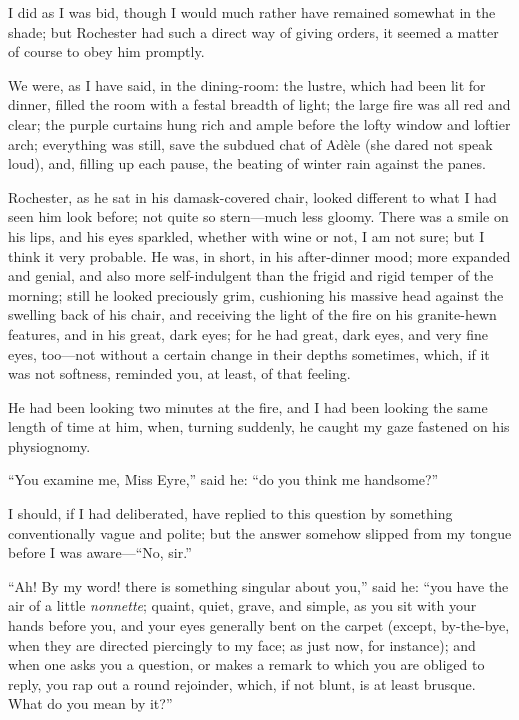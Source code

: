 I did as I was bid, though I would much rather have remained somewhat in
the shade; but \Mr{} Rochester had such a direct way of giving orders, it
seemed a matter of course to obey him promptly.

We were, as I have said, in the dining-room: the lustre, which had been
lit for dinner, filled the room with a festal breadth of light; the
large fire was all red and clear; the purple curtains hung rich and
ample before the lofty window and loftier arch; everything was still,
save the subdued chat of Adèle (she dared not speak loud), and, filling
up each pause, the beating of winter rain against the panes.

\Mr{} Rochester, as he sat in his damask-covered chair, looked different
to what I had seen him look before; not quite so stern---much less
gloomy. There was a smile on his lips, and his eyes sparkled, whether
with wine or not, I am not sure; but I think it very probable. He was,
in short, in his after-dinner mood; more expanded and genial, and also
more self-indulgent than the frigid and rigid temper of the morning;
still he looked preciously grim, cushioning his massive head against the
swelling back of his chair, and receiving the light of the fire on his
granite-hewn features, and in his great, dark eyes; for he had great,
dark eyes, and very fine eyes, too---not without a certain change in
their depths sometimes, which, if it was not softness, reminded you, at
least, of that feeling.

He had been looking two minutes at the fire, and I had been looking the
same length of time at him, when, turning suddenly, he caught my gaze
fastened on his physiognomy.

\enquote{You examine me, Miss Eyre,} said he: \enquote{do you think me
handsome?}

I should, if I had deliberated, have replied to this question by
something conventionally vague and polite; but the answer somehow
slipped from my tongue before I was aware---\enquote{No, sir.}

\enquote{Ah! By my word! there is something singular about you,} said
he: \enquote{you have the air of a little \emph{nonnette}; quaint, quiet,
grave, and simple, as you sit with your hands before you, and your eyes
generally bent on the carpet (except, by-the-bye, when they are directed
piercingly to my face; as just now, for instance); and when one asks you
a question, or makes a remark to which you are obliged to reply, you rap
out a round rejoinder, which, if not blunt, is at least brusque. What
do you mean by it?}

